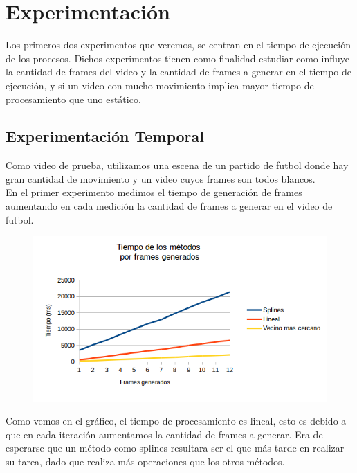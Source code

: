 \section{Experimentación}
Los primeros dos experimentos que veremos, se centran en el tiempo de ejecución de los procesos. Dichos experimentos tienen como finalidad estudiar como influye la cantidad de frames del video y la cantidad de frames a generar en el tiempo de ejecución, y si un video con mucho movimiento implica mayor tiempo de procesamiento que uno estático.\\

\subsection{Experimentación Temporal}

Como video de prueba, utilizamos una escena de un partido de futbol donde hay gran cantidad de movimiento y un video cuyos frames son todos blancos.\\

En el primer experimento medimos el tiempo de generación de frames aumentando en cada medición la cantidad de frames a generar en el video de futbol.

\begin{figure}
  \vspace{-20pt}
  \begin{center}
    \includegraphics[scale= 0.6]{imagenes/aumentandoFramesToAdd.png}
  \end{center}
  \vspace{-10pt}
  \vspace{-10pt}
\end{figure}

Como vemos en el gráfico, el tiempo de procesamiento es lineal, esto es debido a que en cada iteración aumentamos la cantidad de frames a generar. Era de esperarse que un método como splines resultara ser el que más tarde en realizar su tarea, dado que realiza más operaciones que los otros métodos. \\

